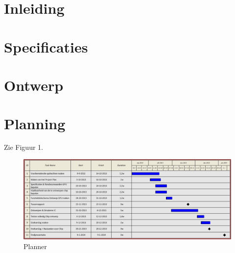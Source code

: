\documentclass{scrartcl}
\begin{document}


\tableofcontents

\section{Inleiding}


\section{Specificaties}


\section{Ontwerp}


\section{Planning}
Zie Figuur 1.
\begin{figure}[H]
\centering
        \includegraphics[width=\linewidth]{inputfiles/planner.png}
        \caption{Planner}
        \label{fig:planner}
\end{figure}

\printbibliography
\end{document}
